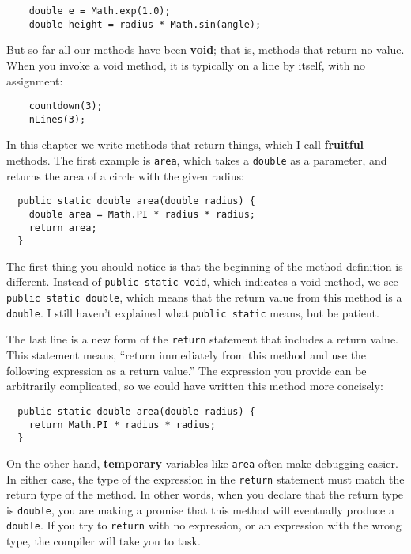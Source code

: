 \documentclass[12pt]{book}
\theoremstyle{definition}
\begin{document}
\begin{lstlisting}
    double e = Math.exp(1.0);
    double height = radius * Math.sin(angle);
\end{lstlisting}
%
But so far all our methods have been {\bf void}; that is, methods
that return no value.  When you invoke a void method, it is typically
on a line by itself, with no assignment:

\begin{lstlisting}
    countdown(3);
    nLines(3);
\end{lstlisting}
%
In this chapter we write methods that return things, which I call 
{\bf fruitful} methods.  The first example is {\tt area}, which takes a
{\tt double} as a parameter, and returns the area of a circle with the
given radius:

\begin{lstlisting}
  public static double area(double radius) {
    double area = Math.PI * radius * radius;
    return area;
  }
\end{lstlisting}
%
The first thing you should notice is that the beginning of the
method definition is different.  Instead of {\tt public static
void}, which indicates a void method, we see {\tt public static
double}, which means that the return value from this method
is a {\tt double}.  I still haven't explained what
{\tt public static} means, but be patient.

The last line is a new form of the
{\tt return} statement that includes a return value.  This
statement means, ``return immediately from this method and
use the following expression as a return value.''  The
expression you provide can be arbitrarily complicated,
so we could have written this method more concisely:

\begin{lstlisting}
  public static double area(double radius) {
    return Math.PI * radius * radius;
  }
\end{lstlisting}
%
On the other hand, {\bf temporary} variables like {\tt area} often
make debugging easier.  In either case, the type of the expression in
the {\tt return} statement must match the return type of the method.
In other words, when you declare that the return type is {\tt double},
you are making a promise that this method will eventually
produce a {\tt double}.  If you try to {\tt return} with no
expression, or an expression with the wrong type, the compiler will
take you to task.

\end{document}
